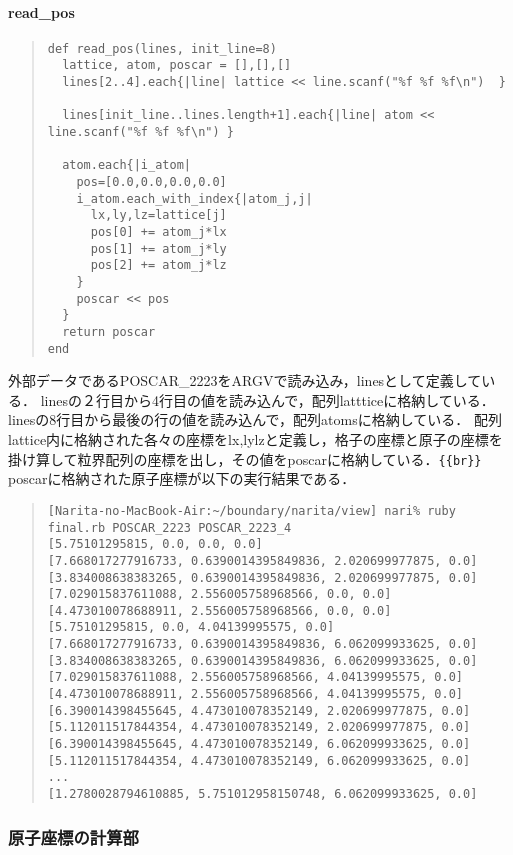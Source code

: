 \paragraph{read\_pos}\begin{quote}\begin{verbatim}
def read_pos(lines, init_line=8)
  lattice, atom, poscar = [],[],[]
  lines[2..4].each{|line| lattice << line.scanf("%f %f %f\n")  }

  lines[init_line..lines.length+1].each{|line| atom << line.scanf("%f %f %f\n") }

  atom.each{|i_atom|
    pos=[0.0,0.0,0.0,0.0]
    i_atom.each_with_index{|atom_j,j|
      lx,ly,lz=lattice[j]
      pos[0] += atom_j*lx
      pos[1] += atom_j*ly
      pos[2] += atom_j*lz
    }
    poscar << pos
  }
  return poscar
end
\end{verbatim}\end{quote}
外部データであるPOSCAR\_2223をARGVで読み込み，linesとして定義している．
linesの２行目から4行目の値を読み込んで，配列lattticeに格納している．
linesの8行目から最後の行の値を読み込んで，配列atomsに格納している．
配列lattice内に格納された各々の座標をlx,lylzと定義し，格子の座標と原子の座標を掛け算して粒界配列の座標を出し，その値をposcarに格納している．\verb|{{br}}|
poscarに格納された原子座標が以下の実行結果である．
\begin{quote}\begin{verbatim}
[Narita-no-MacBook-Air:~/boundary/narita/view] nari% ruby final.rb POSCAR_2223 POSCAR_2223_4
[5.75101295815, 0.0, 0.0, 0.0]
[7.668017277916733, 0.6390014395849836, 2.020699977875, 0.0]
[3.834008638383265, 0.6390014395849836, 2.020699977875, 0.0]
[7.029015837611088, 2.556005758968566, 0.0, 0.0]
[4.473010078688911, 2.556005758968566, 0.0, 0.0]
[5.75101295815, 0.0, 4.04139995575, 0.0]
[7.668017277916733, 0.6390014395849836, 6.062099933625, 0.0]
[3.834008638383265, 0.6390014395849836, 6.062099933625, 0.0]
[7.029015837611088, 2.556005758968566, 4.04139995575, 0.0]
[4.473010078688911, 2.556005758968566, 4.04139995575, 0.0]
[6.390014398455645, 4.473010078352149, 2.020699977875, 0.0]
[5.112011517844354, 4.473010078352149, 2.020699977875, 0.0]
[6.390014398455645, 4.473010078352149, 6.062099933625, 0.0]
[5.112011517844354, 4.473010078352149, 6.062099933625, 0.0]
...
[1.2780028794610885, 5.751012958150748, 6.062099933625, 0.0]
\end{verbatim}\end{quote}
\subsubsection{原子座標の計算部}
